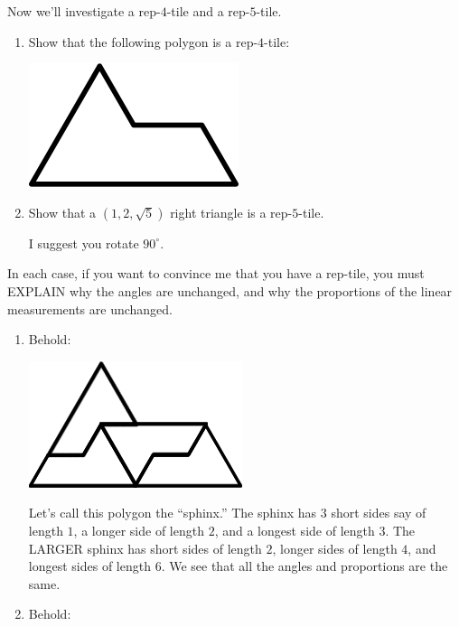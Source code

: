 \documentclass[nooutcomes,noauthor,handout]{ximera}
\begin{document}
\mynewpage


\begin{question}
  Now we'll investigate a rep-$4$-tile and a rep-$5$-tile.
  \begin{enumerate}
  \item Show that the following polygon is a rep-$4$-tile:
    \begin{center}
      \includegraphics[width=.2\textwidth]{sphinx.png}
    \end{center}
  \item Show that a $(1,2,\sqrt{5})$ right triangle is a
    rep-$5$-tile.
    \begin{hint}
      I suggest you rotate $90^\circ$.
    \end{hint}
  \end{enumerate}
  In each case, if you want to convince me that you have a rep-tile,
  you must EXPLAIN why the angles are unchanged, and why the
  proportions of the linear measurements are unchanged.
  \begin{freeResponse}
    \begin{enumerate}
    \item Behold:
      \begin{center}
        \includegraphics[width=.4\textwidth]{STAGEsphinx.png}
      \end{center}
      Let's call this polygon the ``sphinx.'' The sphinx has $3$ short
      sides say of length $1$, a longer side of length $2$, and a
      longest side of length $3$. The LARGER sphinx has short sides of
      length $2$, longer sides of length $4$, and longest sides of
      length $6$. We see that all the angles and proportions are the
      same.
    \item Behold:
      \begin{center}
\end{center}
\end{enumerate}
\end{freeResponse}
\end{question}
\end{document}
